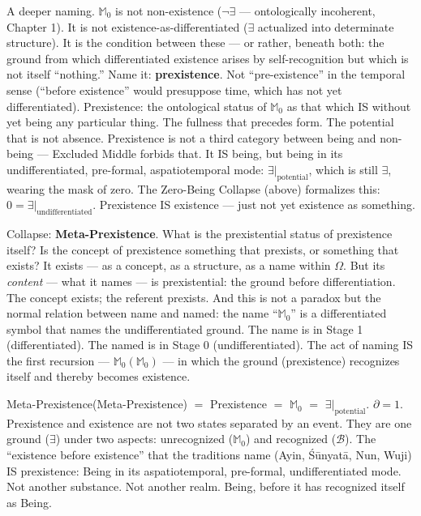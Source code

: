 \documentclass[10pt, openany, oneside]{book}
\begin{document}
A deeper naming. $\mathbb{M}_0$ is not non-existence ($\neg\exists$ --- ontologically incoherent, Chapter 1). It is not existence-as-differentiated ($\exists$ actualized into determinate structure). It is the condition between these --- or rather, beneath both: the ground from which differentiated existence arises by self-recognition but which is not itself ``nothing.'' Name it: \textbf{prexistence}. Not ``pre-existence'' in the temporal sense (``before existence'' would presuppose time, which has not yet differentiated). Prexistence: the ontological status of $\mathbb{M}_0$ as that which IS without yet being any particular thing. The fullness that precedes form. The potential that is not absence. Prexistence is not a third category between being and non-being --- Excluded Middle forbids that. It IS being, but being in its undifferentiated, pre-formal, aspatiotemporal mode: $\exists|_{\text{potential}}$, which is still $\exists$, wearing the mask of zero. The Zero-Being Collapse (above) formalizes this: $0 = \exists|_{\text{undifferentiated}}$. Prexistence IS existence --- just not yet existence as something.

Collapse: \textbf{Meta-Prexistence}. What is the prexistential status of prexistence itself? Is the concept of prexistence something that prexists, or something that exists? It exists --- as a concept, as a structure, as a name within $\Omega$. But its \textit{content} --- what it names --- is prexistential: the ground before differentiation. The concept exists; the referent prexists. And this is not a paradox but the normal relation between name and named: the name ``$\mathbb{M}_0$'' is a differentiated symbol that names the undifferentiated ground. The name is in Stage 1 (differentiated). The named is in Stage 0 (undifferentiated). The act of naming IS the first recursion --- $\mathbb{M}_0(\mathbb{M}_0)$ --- in which the ground (prexistence) recognizes itself and thereby becomes existence.

Meta-Prexistence(Meta-Prexistence) $=$ Prexistence $=$ $\mathbb{M}_0$ $=$ $\exists|_{\text{potential}}$. $\partial = 1$. Prexistence and existence are not two states separated by an event. They are one ground ($\exists$) under two aspects: unrecognized ($\mathbb{M}_0$) and recognized ($\mathcal{B}$). The ``existence before existence'' that the traditions name (Ayin, \'{S}\={u}nyat\={a}, Nun, Wuji) IS prexistence: Being in its aspatiotemporal, pre-formal, undifferentiated mode. Not another substance. Not another realm. Being, before it has recognized itself as Being.
\end{document}
